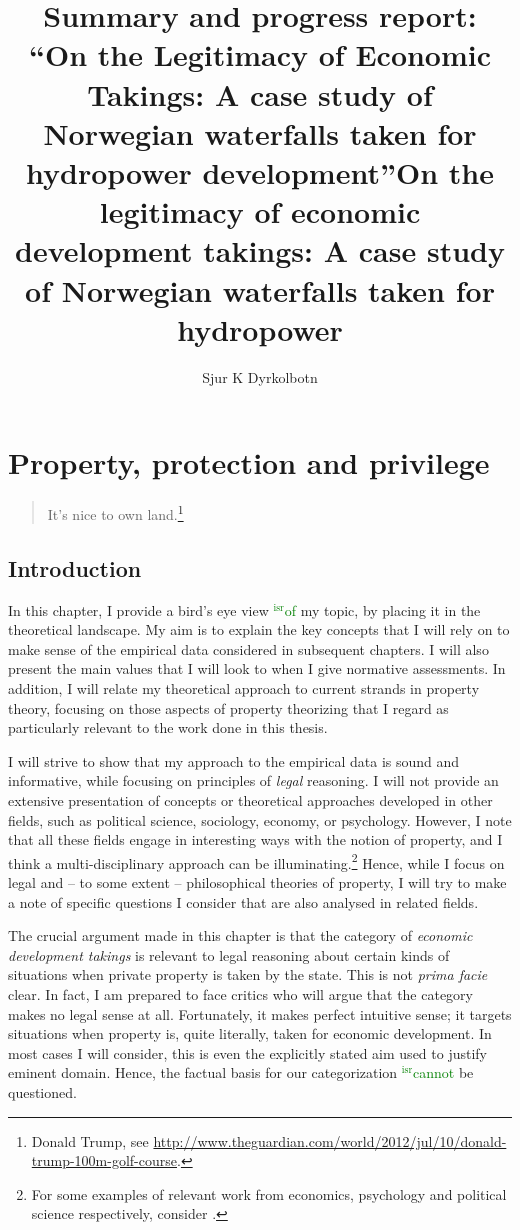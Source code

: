 \documentclass[12pt,a4paper]{book} %
\title{{\huge Summary and progress report:} \\ ``On the Legitimacy of Economic Takings: A case study of Norwegian waterfalls taken for hydropower development''}
\author{Sjur K Dyrkolbotn}
\date{} %
\newcommand{\isr}[1]{\textcolor{green}{$^{\textrm{isr}}${#1}}}
\begin{document}
\title{On the legitimacy of economic development takings: A case study of Norwegian waterfalls taken for hydropower}

\maketitle

\chapter{Property, protection and privilege}\label{chap:1}

\begin{quote}
It's nice to own land.\footnote{Donald Trump, see \url{http://www.theguardian.com/world/2012/jul/10/donald-trump-100m-golf-course}.}
\end{quote}

\section{Introduction}

In this chapter, I provide a bird's eye view \isr {of} my topic, by placing it in the theoretical landscape. My aim is to explain the key concepts that I will rely on to make sense of the empirical data considered in subsequent chapters. I will also present the main values that I will look to when I give normative assessments. In addition, I will relate my theoretical approach to current strands in property theory, focusing on those aspects of property theorizing that I regard as particularly relevant to the work done in this thesis.

I will strive to show that my approach to the empirical data is sound and informative, while focusing on principles of {\it legal} reasoning. I will not provide an extensive presentation of concepts or theoretical approaches developed in other fields, such as political science, sociology, economy, or psychology. However, I note that all these fields engage in interesting ways with the notion of property, and I think a multi-disciplinary approach can be illuminating.\footnote{For some examples of relevant work from economics, psychology and political science respectively, consider \cite{miceli11,nadler08,katz97,carruthers04}.} Hence, while I focus on legal and --  to some extent -- philosophical theories of property, I will try to make a note of specific questions I consider that are also analysed in related fields.

The crucial argument made in this chapter is that the category of {\it economic development takings} is relevant to legal reasoning about certain kinds of situations when private property is taken by the state. This is not {\it prima facie} clear. In fact, I am prepared to face critics who will argue that the category makes no legal sense at all. Fortunately, it makes perfect intuitive sense; it targets situations when property is, quite literally, taken for economic development. In most cases I will consider, this is even the explicitly stated aim used to justify eminent domain. Hence, the factual basis for our categorization \isr {cannot} be questioned.
\end{document}
